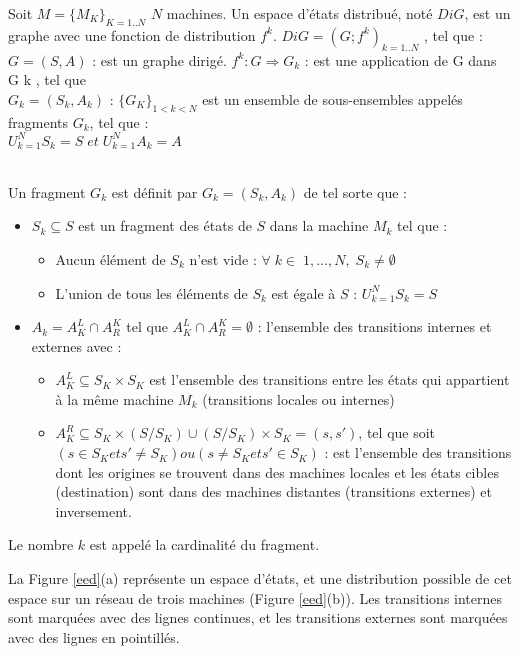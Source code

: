 \begin{definition}
Soit $M =\{M_K\}_{K=1..N}$ $N$ machines. Un espace d'états distribué, noté $DiG$, est un graphe avec une fonction de distribution $f^k$. $DiG = (G; f^k )_{ k=1..N}$ , tel que : $G = (S, A)$ : est un graphe dirigé.
$f^k : G \Rightarrow G_k$ : est une application de G dans G k , tel que \\$G_k = (S_k , A_k )$ : $\{G_K \}_{1<k<N}$ est un ensemble de sous-ensembles appelés fragments $G_k $, tel que :\\ $U^{N}_{k=1} S_k = S\; et\; U^{N}_{k=1}A_k = A$
\end{definition}

\begin{definition} \citep{BENSETIRA2017}\\
Un fragment $G_k$ est définit par $G_k = (S_k , A_k )$ de tel sorte que :
\begin{itemize}
\item $S_k\subseteq S$ est un fragment des états de $S$ dans la machine $M_k$ tel que :
	\begin{itemize}
	\item  Aucun élément de $S_k$ n'est vide : $\forall \;k \in \;1, ..., N,\; S_k \ne \emptyset$
	\item L'union de tous les éléments de $S_k$ est égale à $S$ : $U^{N}_ {k=1} S_k = S$
	\end{itemize}
\item $A_k = A^{L}_{K}\cap A^{K}_{R}$ tel que  $A^{L}_{K} \cap A^{K}_{R}= \emptyset$ : l'ensemble des transitions internes et externes avec :
	\begin{itemize}
	\item  $A^{L}_{K}\subseteq S_K \times S_K$ est l'ensemble des transitions entre les états qui appartient à la même machine $M_k$ (transitions locales ou internes)
	\item  $A^{R}_{K}\subseteq S_K \times (S/S_K ) \cup (S/S_K ) \times S_K = (s, s')$, tel que soit $(s \in S_K et s' \neq S_K ) ou(s \neq S_K et s'
\in S_K )$ : est l'ensemble des transitions dont les origines se trouvent dans des machines locales et les états cibles (destination) sont dans des machines distantes (transitions externes) et inversement.
	\end{itemize}
	
\end{itemize}
Le nombre $k$ est appelé la cardinalité du fragment.
\end{definition}

La Figure \ref{eed}(a) représente un espace d'états, et une distribution possible de cet espace sur un réseau de trois machines (Figure \ref{eed}(b)). Les transitions internes sont marquées avec des lignes continues, et les transitions externes sont marquées avec des lignes en pointillés.

